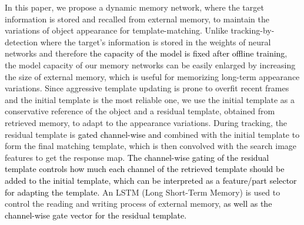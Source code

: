 \documentclass[runningheads]{llncs}
\newcommand{\abc}[1]{\textcolor{black}{#1}}
\newcommand{\ty}[1]{\textcolor{black}{#1}}
\begin{document}
In this paper, we propose a dynamic memory network, where the target information is stored and recalled from  external memory,  to maintain the variations of object appearance for template-matching.
Unlike tracking-by-detection  where the target's information is stored in the weights of neural networks and therefore \ty{the capacity of the model is fixed after offline training}, the model capacity of our memory networks can be easily enlarged by increasing the size of external memory, which is useful for memorizing long-term appearance variations. 
%
Since aggressive template updating is prone to overfit recent frames and the initial template is the most reliable one,
we use the initial template as a conservative reference of the object and a residual template, %
obtained from retrieved memory, to adapt to the appearance variations.
%
During tracking, the residual template is %
\abc{gated channel-wise and} 
combined with the initial template to form the final matching template, which is then convolved with the search image features to get the response map.
\abc{The channel-wise gating of the residual template controls how much each channel of the retrieved template should be added to the initial template, which can be interpreted as a feature/part selector for adapting the template.}
%
An LSTM (Long Short-Term Memory) is used to control the reading and writing process of external memory, 
\abc{as well as the channel-wise gate vector for the residual template.}
%
\end{document}
